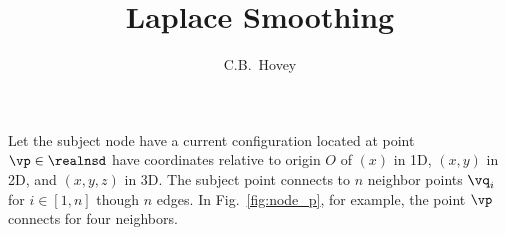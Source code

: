 \documentclass[11pt, oneside]{article}   	%
\title{Laplace Smoothing}
\author{C.B.~Hovey}
\begin{document}
\maketitle


% 
% 
% 
% 


Let the subject node have a current configuration located at 
point $\vp \in \realnsd$ have coordinates relative to origin $O$
of
$(x)$ in 1D, 
$(x, y)$ in 2D, 
and $(x, y, z)$ in 3D.
The subject point connects to $n$ neighbor points
$\vq_i$ for $i \in [1, n]$ though $n$ edges.
In Fig.~\ref{fig:node_p}, for example, the point $\vp$ connects for four 
neighbors.
\end{document}
